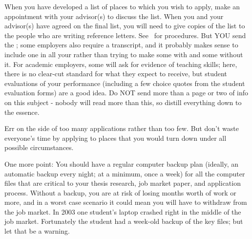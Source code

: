 \documentclass{econtex}
\begin{document}
When you have developed a list of places to which you wish to apply, make an appointment with your advisor(s) to discuss the list.  When you and your advisor(s) have agreed on the final list, you will need to give copies of the list to the people who are writing reference letters.  See \recLet~for procedures.  But YOU send the {\Acorn}; some employers also require a transcript, and it probably makes sense to include one in all your {\Acorns} rather than trying to make some {\Acorns} with and some without it.  For academic employers, some will ask for evidence of teaching skills; here, there is no clear-cut standard for what they expect to receive, but student evaluations of your performance (including a few choice quotes from the student evaluation forms) are a good idea.  Do NOT send more than a page or two of info on this subject - nobody will read more than this, so distill everything down to the essence.

Err on the side of too many applications rather than too few.  But
don't waste everyone's time by applying to places that you would turn
down under all possible circumstances.
  
One more point: You should have a regular computer backup plan
(ideally, an automatic backup every night; at a minimum, once a week)
for all the computer files that are critical to your thesis research,
job market paper, and application process.  Without a backup, you are
at risk of losing months worth of work or more, and in a worst case
scenario it could mean you will have to withdraw from the job market.
In 2003 one student's laptop crashed right in the middle of the job
market.  Fortunately the student had a week-old backup of the key
files; but let that be a warning.

\pagebreak
\end{document}
